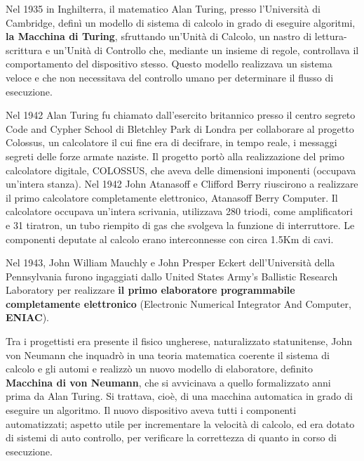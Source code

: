 \documentclass[12pt]{article} %
\begin{document}
Nel 1935 in Inghilterra, il matematico Alan Turing, presso l’Università di Cambridge, definì un modello di sistema di calcolo in grado di eseguire algoritmi, \textbf{la Macchina di Turing}, sfruttando un’Unità di Calcolo, un nastro di lettura-scrittura e un’Unità di Controllo che, mediante un insieme di regole, controllava il comportamento del dispositivo stesso. Questo modello realizzava un sistema veloce e che non necessitava del controllo umano per determinare il flusso di esecuzione. \par\medskip\noindent
Nel 1942 Alan Turing fu chiamato dall’esercito britannico presso il centro segreto Code and Cypher School di Bletchley Park di Londra per collaborare al progetto Colossus, un calcolatore il cui fine era di decifrare, in tempo reale, i messaggi segreti delle forze armate naziste. Il progetto portò alla realizzazione del primo calcolatore digitale, COLOSSUS, che aveva delle dimensioni imponenti (occupava un’intera stanza).
Nel 1942 John Atanasoff e Clifford Berry riuscirono a realizzare il primo calcolatore completamente elettronico, Atanasoff Berry Computer.  Il calcolatore occupava un’intera scrivania, utilizzava 280 triodi, come amplificatori e 31 tiratron, un tubo riempito di gas che svolgeva la funzione di interruttore. Le componenti deputate al calcolo erano interconnesse con circa 1.5Km di cavi. \par\medskip\noindent
Nel 1943, John William Mauchly e John Presper Eckert dell’Università della Pennsylvania furono ingaggiati dallo United States Army’s Ballistic Research Laboratory per realizzare \textbf{il primo elaboratore programmabile completamente elettronico }(Electronic Numerical Integrator And Computer, \textbf{ENIAC}).\par\medskip\noindent
Tra i progettisti era presente il fisico ungherese, naturalizzato statunitense, John von Neumann che inquadrò in una teoria matematica coerente il sistema di calcolo e gli automi e realizzò un nuovo modello di elaboratore, definito \textbf{Macchina di von Neumann}, che si avvicinava a quello formalizzato anni prima da Alan Turing.  Si trattava, cioè, di una macchina automatica in grado di eseguire un algoritmo. Il nuovo dispositivo aveva tutti i componenti automatizzati; aspetto utile per incrementare la velocità di calcolo, ed era dotato di sistemi di auto controllo, per verificare la correttezza di quanto in corso di esecuzione.\par\medskip\noindent
\end{document}
